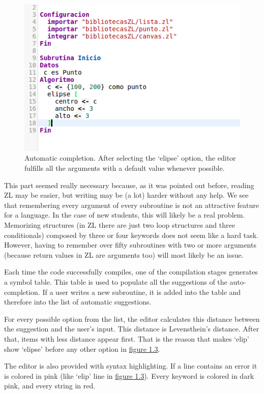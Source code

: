 \documentclass{report}
\begin{document}
\begin{figure}
\centering
\includegraphics[width=0.7\linewidth]{aftercompletion}
\caption[Automatic completion]{Automatic completion. After selecting the `elipse' option, the editor fulfills all the arguments with a default value whenever possible.}
\label{fig:aftercompletion}
\end{figure}

	This part seemed really necessary because, as it was pointed out before, reading ZL may be easier, but writing may be (a lot) harder without any help. We see that remembering every argument of every subroutine is not an attractive feature for a language. In the case of new students, this will likely be a real problem. Memorizing structures (in ZL there are just two loop structures and three conditionals) composed by three or four keywords does not seem like a hard task. However, having to remember over fifty subroutines with two or more arguments (because return values in ZL are arguments too) will most likely be an issue. 
	
	Each time the code successfully compiles, one of the compilation stages generates a symbol table. This table is used to populate all the suggestions of the auto-completion. If a user writes a new subroutine, it is added into the table and therefore into the list of automatic suggestions.
	
	 For every possible option from the list, the editor calculates this distance between the suggestion and the user's input. This distance is Levensthein's distance\cite{levensthein}. After that, items with less distance appear first. That is the reason that makes `elip' show `elipse' before any other option in \hyperref[fig:beforecompletion]{figure 1.3}.
	
	The editor is also provided with syntax highlighting. If a line contains an error it is colored in pink (like `elip' line in \hyperref[fig:beforecompletion]{figure 1.3}). Every keyword is colored in dark pink, and every string in red. 
	
\end{document}
